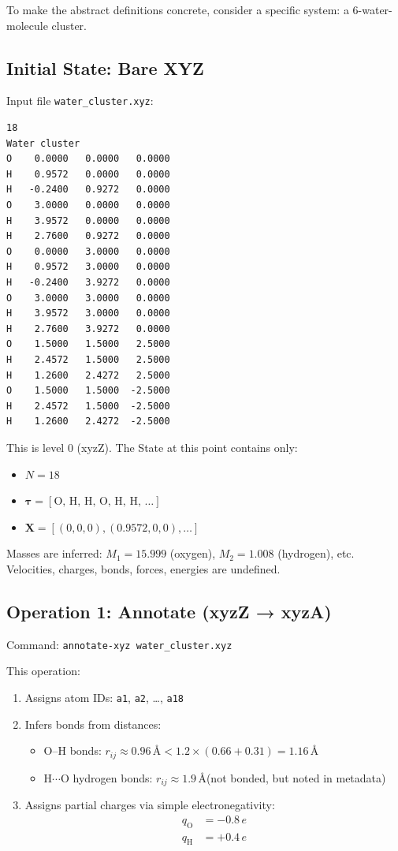 \documentclass[11pt]{article}
\begin{document}
To make the abstract definitions concrete, consider a specific system: a 6-water-molecule cluster.

\subsection{Initial State: Bare XYZ}

Input file \texttt{water\_cluster.xyz}:
\begin{lstlisting}
18
Water cluster
O    0.0000   0.0000   0.0000
H    0.9572   0.0000   0.0000
H   -0.2400   0.9272   0.0000
O    3.0000   0.0000   0.0000
H    3.9572   0.0000   0.0000
H    2.7600   0.9272   0.0000
O    0.0000   3.0000   0.0000
H    0.9572   3.0000   0.0000
H   -0.2400   3.9272   0.0000
O    3.0000   3.0000   0.0000
H    3.9572   3.0000   0.0000
H    2.7600   3.9272   0.0000
O    1.5000   1.5000   2.5000
H    2.4572   1.5000   2.5000
H    1.2600   2.4272   2.5000
O    1.5000   1.5000  -2.5000
H    2.4572   1.5000  -2.5000
H    1.2600   2.4272  -2.5000
\end{lstlisting}

This is level 0 (xyzZ). The State at this point contains only:
\begin{itemize}
\item $N = 18$
\item $\boldsymbol{\tau} = [\text{O, H, H, O, H, H, \ldots}]$
\item $\mathbf{X} = [(0, 0, 0), (0.9572, 0, 0), \ldots]$
\end{itemize}

Masses are inferred: $M_1 = 15.999$ (oxygen), $M_2 = 1.008$ (hydrogen), etc. Velocities, charges, bonds, forces, energies are undefined.

\subsection{Operation 1: Annotate (xyzZ → xyzA)}

Command: \texttt{annotate-xyz water\_cluster.xyz}

This operation:
\begin{enumerate}
\item Assigns atom IDs: \texttt{a1}, \texttt{a2}, \ldots, \texttt{a18}
\item Infers bonds from distances:
    \begin{itemize}
    \item O–H bonds: $r_{ij} \approx 0.96$\,\AA $< 1.2 \times (0.66 + 0.31) = 1.16$\,\AA
    \item H$\cdots$O hydrogen bonds: $r_{ij} \approx 1.9$\,\AA (not bonded, but noted in metadata)
    \end{itemize}
\item Assigns partial charges via simple electronegativity:
    \begin{align*}
    q_{\text{O}} &= -0.8\,e \\
    q_{\text{H}} &= +0.4\,e
    \end{align*}
\end{enumerate}
\end{document}
